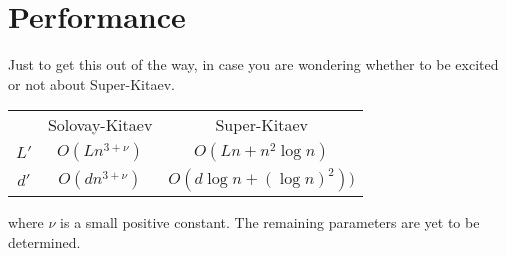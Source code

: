 \section{Performance}

Just to get this out of the way, in case you are wondering whether to be
excited or not about Super-Kitaev.

\begin{tabular}{|c|c|c|}
\hline
   & Solovay-Kitaev & Super-Kitaev\\
$L'$ & $O(Ln^{3+\nu})$ & $O(Ln + n^2 \log n)$\\
$d'$ & $O(dn^{3+\nu})$ & $O(d \log{n} + (\log{n})^2))$\\ 
\hline
\end{tabular}

where $\nu$ is a small positive constant.
The remaining parameters are yet to be determined.

